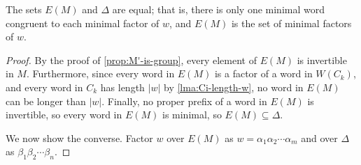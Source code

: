 \documentclass[noindex,noinsetproof,emphthm,12pt]{lmaths}
\begin{document}
\begin{prop}
	The sets $E(M)$ and $\Delta$ are equal; that is, there is only one minimal word congruent to each minimal factor of $w$, and $E(M)$ is the set of minimal factors of $w$.
\end{prop}
\begin{proof}
	By the proof of \cref{prop:M'-is-group}, every element of $E(M)$ is invertible in $M$. Furthermore, since every word in $E(M)$ is a factor of a word in $W(C_k)$, and every word in $C_k$ has length $|w|$ by \cref{lma:Ci-length-w}, no word in $E(M)$ can be longer than $|w|$. Finally, no proper prefix of a word in $E(M)$ is invertible, so every word in $E(M)$ is minimal, so $E(M) \subseteq \Delta$.
\begin{comment}
	So it remains to show that for any $u \in E(M)$, no nonempty prefixes of $u$ are invertible.

	Suppose, for a contradiction, that $u$ factors as $u = u'u''$ such that $u', u'' \in A^+$ and $u'$ is invertible. Then since $u \in W(C_k)$, there exist words $v, t \in C_k$ such that $v = uv'$ and $t = t'u$ for appropriate proper factors $v', t' \in A^+$. By the proof of \cref{prop:M'-is-group}, each word in $C_k$ is trivial in $M$, and so $u'u''v' =_M t'u'u'' =_M \epsilon$. Since $u'$ is invertible, $u''v' =_M t'u'u'' =_M \overline{u'}$; so $u'v'u'' =_M \epsilon$. Then from before, $\epsilon =_M u'u''v' =_M t'u'u''$, hence $u'v' =_M t'u' =_M \overline{u''}$.

	Since $u'v' =_M t'u'$, the two words have a unique common irreducible descendant $z \in A^*$ such that $u'v' \to^*_R z$ and $t'u' \to^*_R z$, where $R$ is our rewriting system from \cref{sec:special-monoids}. By \cref{lma:shorter-irreducible}, because $u \in E(M)$ and $|u'| < |u|$, $u'$ is irreducible by $R$.

Since $u \in E(M)$ and $|u'| < |u|$, $u'$ is irreducible by \cref{lma:shorter-irreducible}. So if $u'v' \to_R \mu$ for some $\mu \in A^*$, then either $u'v' = u'\alpha X\beta$ such that $X$ is the left hand side of a rule in $R$; or $u'v'=\gamma Y Z \delta$ such that $u' = \gamma Y$, $v' = Z\delta$ and $YZ$ is a rule in $R$.

Everything is irreducible by $\{w\to\epsilon\}$, since we are shorter than $w$.
\end{comment}

	We now show the converse. Factor $w$ over $E(M)$ as $w = \alpha_1 \alpha_2 \cdots \alpha_m$ and over $\Delta$ as $\beta_1 \beta_2 \cdots \beta_n$.


\end{proof}
\end{document}
